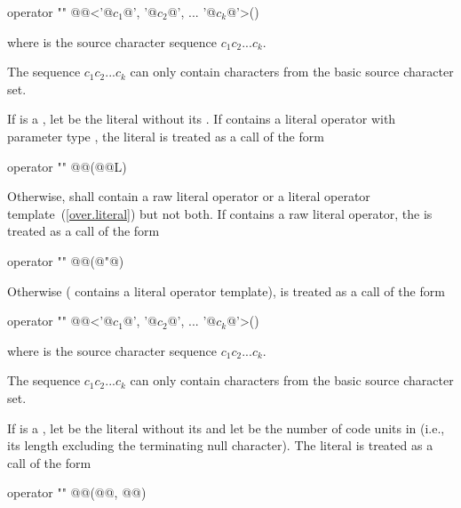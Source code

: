 \begin{codeblock}
operator "" @@<'@$c_1$@', '@$c_2$@', ... '@$c_k$@'>()
\end{codeblock}

where  is the source character sequence $c_1c_2...c_k$. \begin{note} The sequence
$c_1c_2...c_k$ can only contain characters from the basic source character set.
\end{note}

\pnum
If  is a , let  be the
literal without its . If  contains a literal operator
with parameter type , the literal  is treated as a call of
the form

\begin{codeblock}
operator "" @@(@@L)
\end{codeblock}

Otherwise,  shall contain a raw literal operator or a literal operator
template~(\ref{over.literal}) but not both. If  contains a raw literal operator,
the   is treated as a call of the form

\begin{codeblock}
operator "" @@(@"@)
\end{codeblock}

Otherwise ( contains a literal operator template),  is treated as a call
of the form

\begin{codeblock}
operator "" @@<'@$c_1$@', '@$c_2$@', ... '@$c_k$@'>()
\end{codeblock}

where  is the source character sequence $c_1c_2...c_k$. \begin{note} The sequence
$c_1c_2...c_k$ can only contain characters from the basic source character set.
\end{note}

\pnum
If  is a , let  be the
literal without its  and let  be
the number of
code units in  (i.e., its length excluding the terminating
null character).
 The literal  is treated as a call of the form

\begin{codeblock}
operator "" @@(@@, @@)
\end{codeblock}

